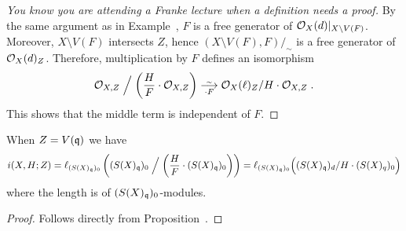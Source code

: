 \documentclass[a4paper,parskip=half,numbers=enddot, DIV=12]{scrreprt}
\begin{document}
\begin{proof}[You know you are attending a Franke lecture when a definition needs a proof]
	By the same argument as in Example~, $F$ is a free generator of $\mathcal{O}_X(d)|_{X\setminus V(F)}$. Moreover, $X\setminus V(F)$ intersects $Z$, hence $(X\setminus V(F),F)/_\sim$ is a free generator of $\mathcal{O}_X(d)_Z$. Therefore, multiplication by $F$ defines an isomorphism
	\begin{align*}
	\Oo_{X,Z} \Bigm/ \left(\frac{H}{F}\cdot\Oo_{X,Z}\right) \isomorphism[\cdot F] \Oo_X(\ell)_Z/H\cdot \Oo_{X,Z}\;.
	\end{align*}
	This shows that the middle term is independent of $F$.
\end{proof}
\begin{cor}
        When $Z = V(\mathfrak{q})$ we have
        \begin{align*}
            i(X,H;Z) = \ell_{(S(X)_{\mathfrak{q}})_0}\left((S(X)_{\mathfrak{q}})_0\Bigm/ \left(\frac{H}{F}\cdot(S(X)_{\mathfrak{q}})_0\right)\right) = \ell_{(S(X)_{\mathfrak{q}})_0}\Big((S(X)_{\mathfrak{q}})_d/H\cdot (S(X)_q)_0\Big)
        \end{align*}
        where the length is of $(S(X)_{\mathfrak{q}})_0$-modules.
\end{cor}
\begin{proof}
	Follows directly from Proposition~.
\end{proof}
\end{document}
